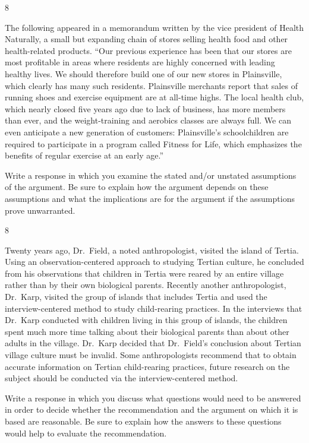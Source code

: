 \documentclass[]{article}
\begin{document}
8

The following appeared in a memorandum written by the vice president of
Health Naturally, a small but expanding chain of stores selling health
food and other health-related products. ``Our previous experience has
been that our stores are most profitable in areas where residents are
highly concerned with leading healthy lives. We should therefore build
one of our new stores in Plainsville, which clearly has many such
residents. Plainsville merchants report that sales of running shoes and
exercise equipment are at all-time highs. The local health club, which
nearly closed five years ago due to lack of business, has more members
than ever, and the weight-training and aerobics classes are always full.
We can even anticipate a new generation of customers: Plainsville's
schoolchildren are required to participate in a program called Fitness
for Life, which emphasizes the benefits of regular exercise at an early
age.''

Write a response in which you examine the stated and/or unstated
assumptions of the argument. Be sure to explain how the argument depends
on these assumptions and what the implications are for the argument if
the assumptions prove unwarranted.

8

Twenty years ago, Dr.~Field, a noted anthropologist, visited the island
of Tertia. Using an observation-centered approach to studying Tertian
culture, he concluded from his observations that children in Tertia were
reared by an entire village rather than by their own biological parents.
Recently another anthropologist, Dr.~Karp, visited the group of islands
that includes Tertia and used the interview-centered method to study
child-rearing practices. In the interviews that Dr.~Karp conducted with
children living in this group of islands, the children spent much more
time talking about their biological parents than about other adults in
the village. Dr.~Karp decided that Dr.~Field's conclusion about Tertian
village culture must be invalid. Some anthropologists recommend that to
obtain accurate information on Tertian child-rearing practices, future
research on the subject should be conducted via the interview-centered
method.

Write a response in which you discuss what questions would need to be
answered in order to decide whether the recommendation and the argument
on which it is based are reasonable. Be sure to explain how the answers
to these questions would help to evaluate the recommendation.
\end{document}
